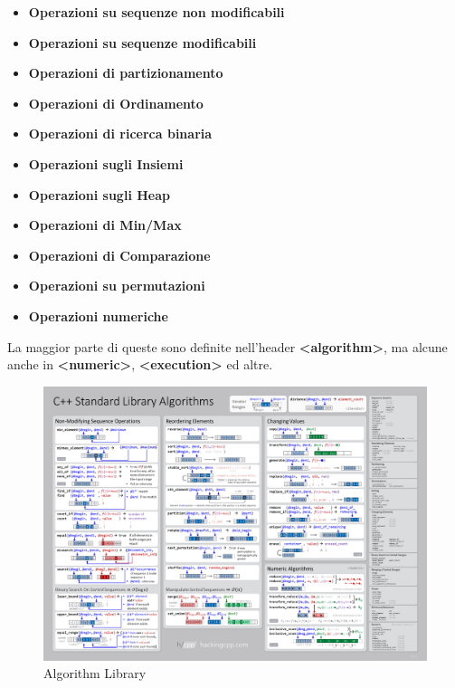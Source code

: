 \begin{itemize}
	\item \textsf{\small \textbf{Operazioni su sequenze non modificabili} }
	\item \textsf{\small \textbf{Operazioni su sequenze modificabili} }
	\item \textsf{\small \textbf{Operazioni di partizionamento} }
	\item \textsf{\small \textbf{Operazioni di Ordinamento} }
	\item \textsf{\small \textbf{Operazioni di ricerca binaria} }
	\item \textsf{\small \textbf{Operazioni sugli Insiemi} }
	\item \textsf{\small \textbf{Operazioni sugli Heap} }
	\item \textsf{\small \textbf{Operazioni di Min/Max} }
	\item \textsf{\small \textbf{Operazioni di Comparazione} }
	\item \textsf{\small \textbf{Operazioni su permutazioni} }
	\item \textsf{\small \textbf{Operazioni numeriche} }
\end{itemize}

\textsf{\small La maggior parte di queste sono definite nell'header \textbf{<algorithm>}, ma alcune anche in \textbf{<numeric>}, \textbf{<execution>} ed altre.} \\

\begin{figure}[H]
	\centering
	\includegraphics[width=1\textwidth, height=1\textheight, keepaspectratio]{./imgs/Algorithm_Library/algorithms.png}
	\caption{Algorithm Library}
	\label{fig:algorithms}
\end{figure}

